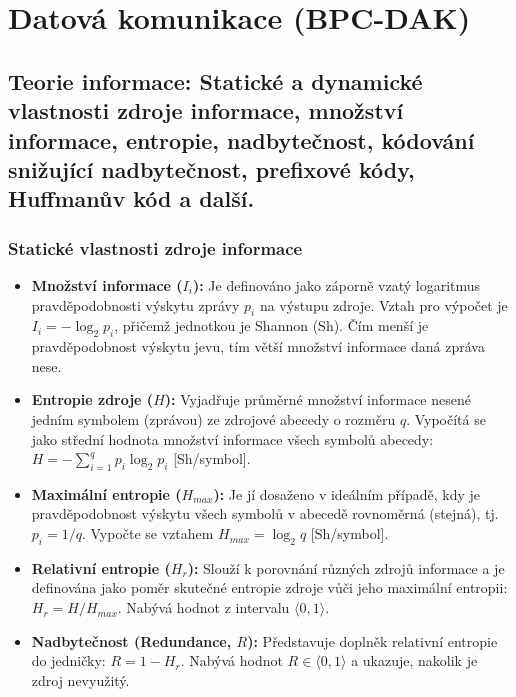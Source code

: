 \section{Datová komunikace (BPC-DAK)}
\subsection{Teorie informace: Statické a dynamické vlastnosti zdroje informace, množství informace, entropie, nadbytečnost, kódování snižující nadbytečnost, prefixové kódy, Huffmanův kód a další.}
    \subsubsection{Statické vlastnosti zdroje informace}
        \begin{itemize}
            \item \textbf{Množství informace ($I_i$):} Je definováno jako záporně vzatý logaritmus pravděpodobnosti výskytu zprávy $p_i$ na výstupu zdroje. Vztah pro výpočet je $I_i = -\log_2 p_i$, přičemž jednotkou je Shannon (Sh). Čím menší je pravděpodobnost výskytu jevu, tím větší množství informace daná zpráva nese.
            \item \textbf{Entropie zdroje ($H$):} Vyjadřuje průměrné množství informace nesené jedním symbolem (zprávou) ze zdrojové abecedy o rozměru $q$. Vypočítá se jako střední hodnota množství informace všech symbolů abecedy: $H = -\sum_{i=1}^{q} p_i \log_2 p_i$ [Sh/symbol].
            \item \textbf{Maximální entropie ($H_{max}$):} Je jí dosaženo v ideálním případě, kdy je pravděpodobnost výskytu všech symbolů v abecedě rovnoměrná (stejná), tj. $p_i = 1/q$. Vypočte se vztahem $H_{max} = \log_2 q$ [Sh/symbol].
            \item \textbf{Relativní entropie ($H_r$):} Slouží k porovnání různých zdrojů informace a je definována jako poměr skutečné entropie zdroje vůči jeho maximální entropii: $H_r = H / H_{max}$. Nabývá hodnot z intervalu $\langle 0, 1 \rangle$.
            \item \textbf{Nadbytečnost (Redundance, $R$):} Představuje doplněk relativní entropie do jedničky: $R = 1 - H_r$. Nabývá hodnot $R \in \langle 0, 1 \rangle$ a ukazuje, nakolik je zdroj nevyužitý.
        \end{itemize}
